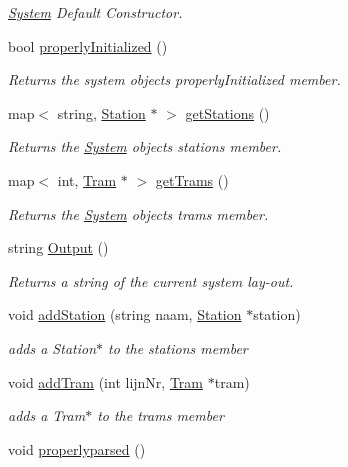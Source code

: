 \begin{DoxyCompactItemize}
\begin{DoxyCompactList}\small\item\em \hyperlink{classSystem}{System} Default Constructor. \end{DoxyCompactList}\item 
bool \hyperlink{classSystem_a8532240d722aafc7084ca6047909c8da}{properly\+Initialized} ()
\begin{DoxyCompactList}\small\item\em Returns the system object\textquotesingle{}s properly\+Initialized member. \end{DoxyCompactList}\item 
map$<$ string, \hyperlink{classStation}{Station} $\ast$ $>$ \hyperlink{classSystem_a30d05f13a13f95f580a0e705142fa3ea}{get\+Stations} ()
\begin{DoxyCompactList}\small\item\em Returns the \hyperlink{classSystem}{System} object\textquotesingle{}s stations member. \end{DoxyCompactList}\item 
map$<$ int, \hyperlink{classTram}{Tram} $\ast$ $>$ \hyperlink{classSystem_a7ef5389572f830ddaa61052ce09f48de}{get\+Trams} ()
\begin{DoxyCompactList}\small\item\em Returns the \hyperlink{classSystem}{System} object\textquotesingle{}s trams member. \end{DoxyCompactList}\item 
string \hyperlink{classSystem_afd117849fbf4d7d8dc0f54988589c249}{Output} ()
\begin{DoxyCompactList}\small\item\em Returns a string of the current system lay-\/out. \end{DoxyCompactList}\item 
void \hyperlink{classSystem_a8d73a59e5ca0c23cc36d3bf4b7ac902d}{add\+Station} (string naam, \hyperlink{classStation}{Station} $\ast$station)
\begin{DoxyCompactList}\small\item\em adds a Station$\ast$ to the stations member \end{DoxyCompactList}\item 
void \hyperlink{classSystem_a9c6d16ae38e21499491a7059d67f9284}{add\+Tram} (int lijn\+Nr, \hyperlink{classTram}{Tram} $\ast$tram)
\begin{DoxyCompactList}\small\item\em adds a Tram$\ast$ to the trams member \end{DoxyCompactList}\item 
void \hyperlink{classSystem_a8060d45e6030ee1ad01a11a990bdd1ad}{properlyparsed} ()\hypertarget{classSystem_a8060d45e6030ee1ad01a11a990bdd1ad}{}\label{classSystem_a8060d45e6030ee1ad01a11a990bdd1ad}


\end{DoxyCompactItemize}
